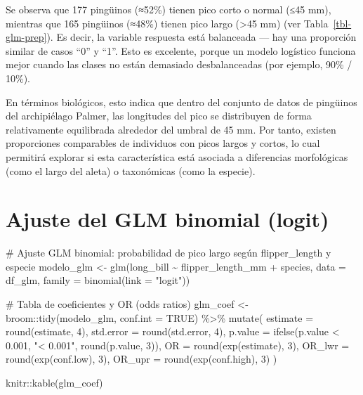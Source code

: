 \documentclass[
  spanish,
  11pt,
  a4paper,
  DIV=11,
  numbers=noendperiod]{scrartcl}
\newenvironment{Shaded}{\begin{snugshade}}{\end{snugshade}}
\newcommand{\AttributeTok}[1]{\textcolor[rgb]{0.40,0.45,0.13}{#1}}
\newcommand{\CommentTok}[1]{\textcolor[rgb]{0.37,0.37,0.37}{#1}}
\newcommand{\ConstantTok}[1]{\textcolor[rgb]{0.56,0.35,0.01}{#1}}
\newcommand{\DecValTok}[1]{\textcolor[rgb]{0.68,0.00,0.00}{#1}}
\newcommand{\FloatTok}[1]{\textcolor[rgb]{0.68,0.00,0.00}{#1}}
\newcommand{\FunctionTok}[1]{\textcolor[rgb]{0.28,0.35,0.67}{#1}}
\newcommand{\NormalTok}[1]{\textcolor[rgb]{0.00,0.23,0.31}{#1}}
\newcommand{\OtherTok}[1]{\textcolor[rgb]{0.00,0.23,0.31}{#1}}
\newcommand{\SpecialCharTok}[1]{\textcolor[rgb]{0.37,0.37,0.37}{#1}}
\newcommand{\StringTok}[1]{\textcolor[rgb]{0.13,0.47,0.30}{#1}}
\begin{document}
Se observa que 177 pingüinos (≈52\%) tienen pico corto o normal (≤45
mm), mientras que 165 pingüinos (≈48\%) tienen pico largo
(\textgreater45 mm) (ver Tabla~\ref{tbl-glm-prep}). Es decir, la
variable respuesta está balanceada --- hay una proporción similar de
casos ``0'' y ``1''. Esto es excelente, porque un modelo logístico
funciona mejor cuando las clases no están demasiado desbalanceadas (por
ejemplo, 90\% / 10\%).

En términos biológicos, esto indica que dentro del conjunto de datos de
pingüinos del archipiélago Palmer, las longitudes del pico se
distribuyen de forma relativamente equilibrada alrededor del umbral de
45 mm. Por tanto, existen proporciones comparables de individuos con
picos largos y cortos, lo cual permitirá explorar si esta característica
está asociada a diferencias morfológicas (como el largo del aleta) o
taxonómicas (como la especie).

\section{Ajuste del GLM binomial
(logit)}\label{ajuste-del-glm-binomial-logit}

\begin{Shaded}
\begin{Highlighting}[numbers=left,,]
\CommentTok{\# Ajuste GLM binomial: probabilidad de pico largo según flipper\_length y especie}
\NormalTok{modelo\_glm }\OtherTok{\textless{}{-}} \FunctionTok{glm}\NormalTok{(long\_bill }\SpecialCharTok{\textasciitilde{}}\NormalTok{ flipper\_length\_mm }\SpecialCharTok{+}\NormalTok{ species,}
                  \AttributeTok{data =}\NormalTok{ df\_glm,}
                  \AttributeTok{family =} \FunctionTok{binomial}\NormalTok{(}\AttributeTok{link =} \StringTok{"logit"}\NormalTok{))}

\CommentTok{\# Tabla de coeficientes y OR (odds ratios)}
\NormalTok{glm\_coef }\OtherTok{\textless{}{-}}\NormalTok{ broom}\SpecialCharTok{::}\FunctionTok{tidy}\NormalTok{(modelo\_glm, }\AttributeTok{conf.int =} \ConstantTok{TRUE}\NormalTok{) }\SpecialCharTok{\%\textgreater{}\%}
  \FunctionTok{mutate}\NormalTok{(}
    \AttributeTok{estimate =} \FunctionTok{round}\NormalTok{(estimate, }\DecValTok{4}\NormalTok{),}
    \AttributeTok{std.error =} \FunctionTok{round}\NormalTok{(std.error, }\DecValTok{4}\NormalTok{),}
    \AttributeTok{p.value =} \FunctionTok{ifelse}\NormalTok{(p.value }\SpecialCharTok{\textless{}} \FloatTok{0.001}\NormalTok{, }\StringTok{"\textless{} 0.001"}\NormalTok{, }\FunctionTok{round}\NormalTok{(p.value, }\DecValTok{3}\NormalTok{)),}
    \AttributeTok{OR =} \FunctionTok{round}\NormalTok{(}\FunctionTok{exp}\NormalTok{(estimate), }\DecValTok{3}\NormalTok{),}
    \AttributeTok{OR\_lwr =} \FunctionTok{round}\NormalTok{(}\FunctionTok{exp}\NormalTok{(conf.low), }\DecValTok{3}\NormalTok{),}
    \AttributeTok{OR\_upr =} \FunctionTok{round}\NormalTok{(}\FunctionTok{exp}\NormalTok{(conf.high), }\DecValTok{3}\NormalTok{)}
\NormalTok{  )}

\NormalTok{knitr}\SpecialCharTok{::}\FunctionTok{kable}\NormalTok{(glm\_coef)}
\end{Highlighting}
\end{Shaded}
\end{document}
